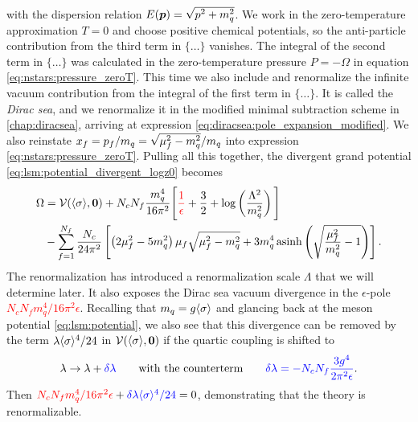 with the dispersion relation $E(\vec{p}) = \sqrt{\smash[b]{p^2 + m_q^2}}$.
We work in the zero-temperature approximation $T=0$ and choose positive chemical potentials,
so the anti-particle contribution from the third term in $\{\ldots\}$ vanishes.
The integral of the second term in $\{\ldots\}$ was calculated in the zero-temperature pressure $P=-\Omega$ in equation \eqref{eq:nstars:pressure_zeroT}.
This time we also include and renormalize the infinite vacuum contribution from the integral of the first term in $\{\ldots\}$.
It is called the \emph{Dirac sea}, and we renormalize it in the modified minimal subtraction scheme in \cref{chap:diracsea},
arriving at expression \eqref{eq:diracsea:pole_expansion_modified}.
We also reinstate $x_f = p_f / m_q = \sqrt{\smash[b]{\mu_f^2-m_q^2}} / m_q$ into expression \eqref{eq:nstars:pressure_zeroT}.
Pulling all this together, the divergent grand potential \eqref{eq:lsm:potential_divergent_logz0} becomes
\begin{equation}
\begin{split}
	\Omega &= \pot(\avg{\sigma},\vec{0}) + N_c N_f \frac{m_q^4}{16 \pi^2} \Bigg[ \textcolor{red}{\frac{1}{\epsilon}} + \frac{3}{2} + \log\left(\frac{{\Lambda}^2}{m_q^2}\right) \Bigg] \\
	       &- \sum_{f=1}^{\smash{N_f}} \frac{N_c}{24 \pi^2} \left[ \left( 2 \mu_f^2 - 5 m_q^2 \right) \mu_f \sqrt{\mu_f^2 - m_q^2} + 3 m_q^4 \asinh \left( \sqrt{\frac{\mu_{\smash{f}}^2}{m_q^2}-1} \right) \right] .
\end{split}
\label{eq:lsm:grand_potential_nonrenormalized}
\end{equation}
The renormalization has introduced a renormalization scale $\Lambda$ that we will determine later.
It also exposes the Dirac sea vacuum divergence in the $\epsilon$-pole \textcolor{red}{$N_c N_f m_q^4 / 16 \pi^2 \epsilon$}.
Recalling that $m_q=g \avg{\sigma}$ and glancing back at the meson potential \eqref{eq:lsm:potential},
we also see that this divergence can be removed by the term \textcolor{blue}{$\lambda \avg{\sigma}^4 / 24$} in $\pot(\avg{\sigma},\vec{0})$
if the quartic coupling is shifted to
\begin{equation}
	\lambda \rightarrow \lambda + \textcolor{blue}{\delta\lambda}
	\qquad \text{with the counterterm} \qquad
	\textcolor{blue}{\delta\lambda = -N_c N_f \frac{3 g^4}{2 \pi^2 \epsilon}} .
\end{equation}
Then $\textcolor{red}{N_c N_f m_q^4 / 16 \pi^2 \epsilon} + \textcolor{blue}{\delta\lambda \avg{\sigma}^4 / 24} = 0$,
demonstrating that the theory is renormalizable.

